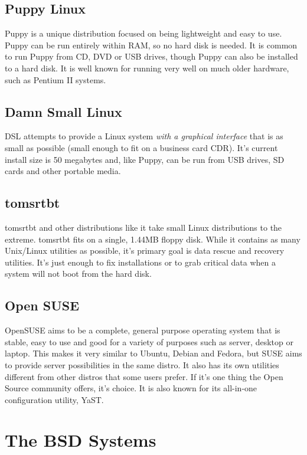 \subsection{Puppy Linux}

Puppy is a unique distribution focused on being lightweight and easy to use.  Puppy can be run entirely within RAM, so no hard disk is needed.  It is common to run Puppy from CD, DVD or USB drives, though Puppy can also be installed to a hard disk.  It is well known for running very well on much older hardware, such as Pentium II systems.

\subsection{Damn Small Linux}

DSL attempts to provide a Linux system \textit{with a graphical interface} that is as small as possible (small enough to fit on a business card CDR).  It's current install size is 50 megabytes and, like Puppy, can be run from USB drives, SD cards and other portable media.

\subsection{tomsrtbt}

tomsrtbt and other distributions like it take small Linux distributions to the extreme.  tomsrtbt fits on a single, 1.44MB floppy disk.  While it contains as many Unix/Linux utilities as possible, it's primary goal is data rescue and recovery utilities.  It's just enough to fix installations or to grab critical data when a system will not boot from the hard disk.

\subsection{Open SUSE}

OpenSUSE aims to be a complete, general purpose operating system that is stable, easy to use and good for a variety of purposes such as server, desktop or laptop.  This makes it very similar to Ubuntu, Debian and Fedora, but SUSE aims to provide server possibilities in the same distro.  It also has its own utilities different from other distros that some users prefer.  If it's one thing the Open Source community offers, it's choice.  It is also known for its all-in-one configuration utility, YaST.

\section{The BSD Systems}

